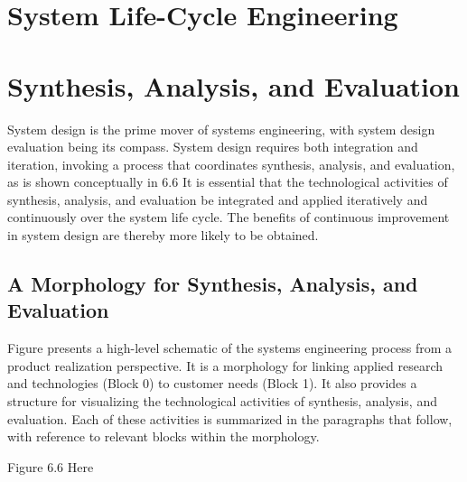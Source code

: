 
\section{System Life-Cycle Engineering}


\section{Synthesis, Analysis, and Evaluation}

System design is the prime mover of systems engineering, with system design evaluation being its compass. System design requires both integration and iteration, invoking a process that coordinates synthesis, analysis, and evaluation, as is shown conceptually in 6.6 It is essential that the technological activities of synthesis, analysis, and evaluation be integrated and applied iteratively and continuously over the system life cycle. The benefits of continuous improvement in system design are thereby more likely to be obtained.

\subsection{A Morphology for Synthesis, Analysis, and Evaluation}

Figure presents a high-level schematic of the systems engineering process from a product realization perspective. It is a morphology for linking applied research and technologies (Block 0) to customer needs (Block 1). It also provides a structure for visualizing the technological activities of synthesis, analysis, and evaluation. Each of these activities is summarized in the paragraphs that follow, with reference to relevant blocks within the morphology.

Figure 6.6 Here

